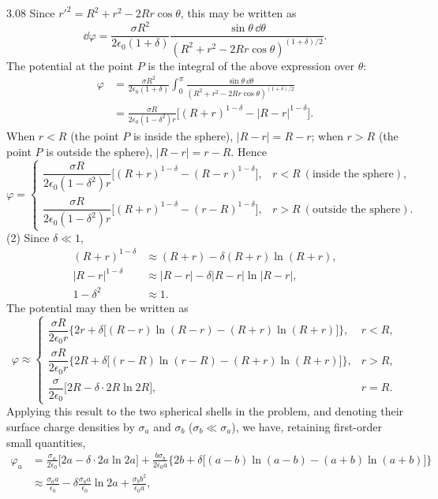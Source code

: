 \begin{solution}{3.08}
Since $r'^2=R^2+r^2-2Rr\cos\theta$, this may be written as
\[
\dd\varphi=\frac{\sigma R^2}{2\epsilon_0(1+\delta)}
\frac{\sin\theta\,\dd\theta}{(R^2+r^2-2Rr\cos\theta)^{(1+\delta)/2}}.
\]
The potential at the point $P$ is the integral of the above expression over $\theta$:
\begin{align*}
\varphi&=\frac{\sigma R^2}{2\epsilon_0(1+\delta)}\int_0^\pi
\frac{\sin\theta\,\dd\theta}{(R^2+r^2-2Rr\cos\theta)^{(1+\delta)/2}}\\
&=\frac{\sigma R}{2\epsilon_0(1-\delta^2)r}\bigl[(R+r)^{1-\delta}-|R-r|^{1-\delta}\bigr].
\end{align*}
When $r<R$ (the point $P$ is inside the sphere), $|R-r|=R-r$; when $r>R$ (the point $P$ is outside the sphere), $|R-r|=r-R$. Hence
\[
\varphi=
\begin{cases}
\dfrac{\sigma R}{2\epsilon_0(1-\delta^2)r}\bigl[(R+r)^{1-\delta}-(R-r)^{1-\delta}\bigr], & r<R\ (\text{inside the sphere}),\\[10pt]
\dfrac{\sigma R}{2\epsilon_0(1-\delta^2)r}\bigl[(R+r)^{1-\delta}-(r-R)^{1-\delta}\bigr], & r>R\ (\text{outside the sphere}).
\end{cases}
\]
(2) Since $\delta\ll 1$,
\begin{align*}
(R+r)^{1-\delta}&\approx(R+r)-\delta(R+r)\ln(R+r),\\
|R-r|^{1-\delta}&\approx|R-r|-\delta|R-r|\ln|R-r|,\\
1-\delta^2&\approx 1.
\end{align*}
The potential may then be written as
\[
\varphi\approx
\begin{cases}
\dfrac{\sigma R}{2\epsilon_0r}\bigl\{2r+\delta\bigl[(R-r)\ln(R-r)-(R+r)\ln(R+r)\bigr]\bigr\}, & r<R,\\[10pt]
\dfrac{\sigma R}{2\epsilon_0r}\bigl\{2R+\delta\bigl[(r-R)\ln(r-R)-(R+r)\ln(R+r)\bigr]\bigr\}, & r>R,\\[10pt]
\dfrac{\sigma}{2\epsilon_0}\bigl[2R-\delta\cdot 2R\ln 2R\bigr], & r=R.
\end{cases}
\]
Applying this result to the two spherical shells in the problem, and denoting their surface charge densities by $\sigma_a$ and $\sigma_b$ ($\sigma_b\ll\sigma_a$), we have, retaining first-order small quantities,
\begin{align*}
\varphi_a&=\frac{\sigma_a}{2\epsilon_0}\bigl[2a-\delta\cdot 2a\ln 2a\bigr]
+\frac{b\sigma_b}{2\epsilon_0a}\bigl\{2b+\delta\bigl[(a-b)\ln(a-b)-(a+b)\ln(a+b)\bigr]\bigr\}\\
&\approx\frac{\sigma_aa}{\epsilon_0}-\delta\frac{\sigma_aa}{\epsilon_0}\ln 2a+\frac{\sigma_bb^2}{\epsilon_0a},\\

\end{align*}
\end{solution}
